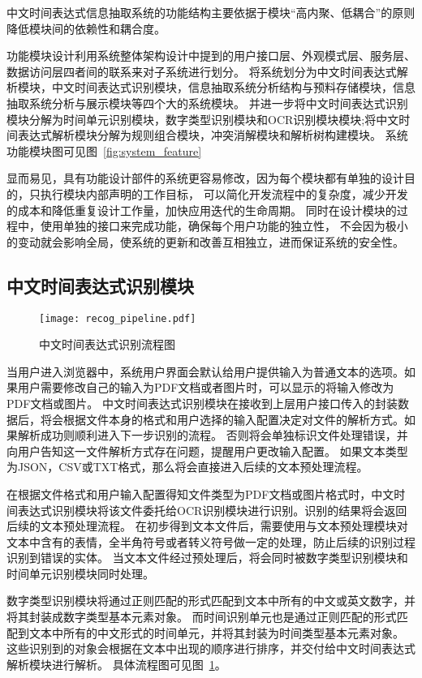 中文时间表达式信息抽取系统的功能结构主要依据于模块“高内聚、低耦合”的原则降低模块间的依赖性和耦合度。

功能模块设计利用系统整体架构设计中提到的用户接口层、外观模式层、服务层、数据访问层四者间的联系来对子系统进行划分。
将系统划分为中文时间表达式解析模块，中文时间表达式识别模块，信息抽取系统分析结构与预料存储模块，信息抽取系统分析与展示模块等四个大的系统模块。
并进一步将中文时间表达式识别模块分解为时间单元识别模块，数字类型识别模块和OCR识别模块模块;将中文时间表达式解析模块分解为规则组合模块，冲突消解模块和解析树构建模块。
系统功能模块图可见图~\ref{fig:system_feature}

显而易见，具有功能设计部件的系统更容易修改，因为每个模块都有单独的设计目的，只执行模块内部声明的工作目标，
可以简化开发流程中的复杂度，减少开发的成本和降低重复设计工作量，加快应用迭代的生命周期。
同时在设计模块的过程中，使用单独的接口来完成功能，确保每个用户功能的独立性，
不会因为极小的变动就会影响全局，使系统的更新和改善互相独立，进而保证系统的安全性。


\subsection{中文时间表达式识别模块}

\begin{figure}[h]
  \centering
  \texttt{[image: recog\_pipeline.pdf]}
  \caption{中文时间表达式识别流程图}
  \label{fig:recog_pipeline}
\end{figure}

当用户进入浏览器中，系统用户界面会默认给用户提供输入为普通文本的选项。如果用户需要修改自己的输入为PDF文档或者图片时，可以显示的将输入修改为PDF文档或图片。
中文时间表达式识别模块在接收到上层用户接口传入的封装数据后，将会根据文件本身的格式和用户选择的输入配置决定对文件的解析方式。如果解析成功则顺利进入下一步识别的流程。
否则将会单独标识文件处理错误，并向用户告知这一文件解析方式存在问题，提醒用户更改输入配置。
如果文本类型为JSON，CSV或TXT格式，那么将会直接进入后续的文本预处理流程。

在根据文件格式和用户输入配置得知文件类型为PDF文档或图片格式时，中文时间表达式识别模块将该文件委托给OCR识别模块进行识别。识别的结果将会返回后续的文本预处理流程。
在初步得到文本文件后，需要使用与文本预处理模块对文本中含有的表情，全半角符号或者转义符号做一定的处理，防止后续的识别过程识别到错误的实体。
当文本文件经过预处理后，将会同时被数字类型识别模块和时间单元识别模块同时处理。

数字类型识别模块将通过正则匹配的形式匹配到文本中所有的中文或英文数字，并将其封装成数字类型基本元素对象。
而时间识别单元也是通过正则匹配的形式匹配到文本中所有的中文形式的时间单元，并将其封装为时间类型基本元素对象。
这些识别到的对象会根据在文本中出现的顺序进行排序，并交付给中文时间表达式解析模块进行解析。
具体流程图可见图~\ref{fig:recog_pipeline}。

